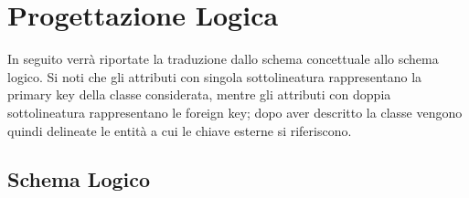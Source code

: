 \documentclass[a4page]{article}
\begin{document}
\section{Progettazione Logica}
In seguito verrà riportate la traduzione dallo schema concettuale allo schema logico. Si noti che gli attributi con singola sottolineatura rappresentano la primary key della classe considerata, mentre gli attributi con doppia sottolineatura  rappresentano le foreign key; dopo aver descritto la classe vengono quindi delineate le entità a cui le chiave esterne si riferiscono.
\subsection{Schema Logico}

\setlength{\LTleft}{-50pt}
\setlength\LTright{0pt}
\renewcommand\arraystretch{2}
\small
\end{document}
